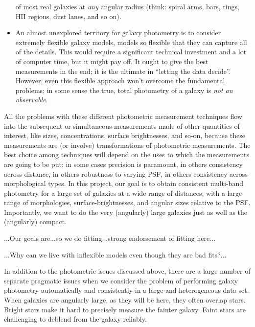 \documentclass[12pt,preprint,pdftex]{aastex}
\begin{document}
\begin{itemize}
  of most real galaxies at \emph{any} angular radius (think: spiral
  arms, bars, rings, HII regions, dust lanes, and so on).
\item An almost unexplored territory for galaxy photometry is to
  consider extremely flexible galaxy models, models so flexible that
  they can capture all of the details.  This would require a
  significant technical investment and a lot of computer time, but it
  might pay off.  It ought to give the best measurements in the end;
  it is the ultimate in ``letting the data decide''.  However, even
  this flexible approach won't overcome the fundamental problems; in
  some sense the true, total photometry of a galaxy is \emph{not an
    observable}.
\end{itemize}
All the problems with these different photometric measurement
techniques flow into the subsequent or simultaneous measurements made
of other quantities of interest, like sizes, concentrations, surface
brightnesses, and so-on, because these measurements are (or involve)
transformations of photometric measurements.  The best choice among
techniques will depend on the uses to which the measurements are going
to be put; in some cases precision is paramount, in others consistency
across distance, in others robustness to varying PSF, in others
consistency across morphological types.  In this project, our goal is
to obtain consistent multi-band photometry for a large set of galaxies
at a wide range of distances, with a large range of morphologies,
surface-brightnesses, and angular sizes relative to the PSF.
Importantly, we want to do the very (angularly) large galaxies just as
well as the (angularly) compact.

...Our goals are...so we do fitting...strong endorsement of fitting here...

...Why can we live with inflexible models even though they are bad fits?...

In addition to the photometric issues discussed above, there are a
large number of separate pragmatic issues when we consider the problem
of performing galaxy photometry automatically and consistently in a
large and heterogeneous data set.  When galaxies are angularly large,
as they will be here, they often overlap stars.  Bright stars make it
hard to precisely measure the fainter galaxy.  Faint stars are
challenging to deblend from the galaxy reliably.
\end{document}
